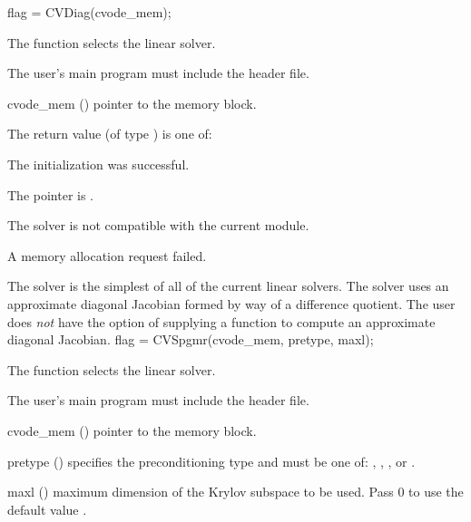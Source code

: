 {
  flag = CVDiag(cvode\_mem);
}
{
  The function  selects the {\cvdiag} linear solver. 

  The user's main program must include the  header file.
}
{
  \begin{args}
  \item[cvode\_mem] ()
    pointer to the {\cvode} memory block.
  \end{args}
}
{
  The return value  (of type ) is one of:
  \begin{args}
  \item[\Id{CVDIAG\_SUCCESS}]
    The {\cvdiag} initialization was successful.
  \item[\Id{CVDIAG\_MEM\_NULL}]
    The  pointer is .
  \item[\Id{CVDIAG\_ILL\_INPUT}]
    The {\cvdiag} solver is not compatible with the current {\nvector} module.
  \item[\Id{CVDIAG\_MEM\_FAIL}]
    A memory allocation request failed.
  \end{args}
}
{
  The {\cvdiag} solver is the simplest of all of the current {\cvode} linear solvers. 
  The {\cvdiag} solver uses an approximate diagonal Jacobian formed by way of a
  difference quotient. The user does {\em not} have the option of supplying a
  function to compute an approximate diagonal Jacobian.
}
{
  flag = CVSpgmr(cvode\_mem, pretype, maxl);
}
{
  The function  selects the {\cvspgmr} linear solver. 

  The user's main program must include the  header file.
}
{
  \begin{args}
  \item[cvode\_mem] ()
    pointer to the {\cvode} memory block.
  \item[pretype] ()
    specifies the preconditioning type and must be one of: 
    , , , or .
  \item[maxl] ()
    maximum dimension of the Krylov subspace to be used. Pass $0$ to use the 
    default value .
  \end{args}
}
